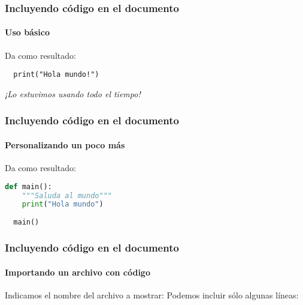 \documentclass[svgnames]{beamer}
\begin{document}
\begin{frame}[fragile]
  \frametitle{Incluyendo código en el documento}
  \framesubtitle{Uso básico}
  
  Da como resultado:
  \begin{lstlisting}
  print("Hola mundo!")
  \end{lstlisting}\pause
  \emph{¡Lo estuvimos usando todo el tiempo!}
\end{frame}

\begin{frame}[fragile]
  \frametitle{Incluyendo código en el documento}
  \framesubtitle{Personalizando un poco más}
  
  Da como resultado:
\begin{lstlisting}[language=python]
  def main():
    """Saluda al mundo"""
    print("Hola mundo")
  
  main()
\end{lstlisting}
\end{frame}

\begin{frame}[fragile]
  \frametitle{Incluyendo código en el documento}
  \framesubtitle{Importando un archivo con código}
  Indicamos el nombre del archivo a mostrar:
  \pause
  Podemos incluir sólo algunas líneas:
  

\end{frame}
\end{document}
